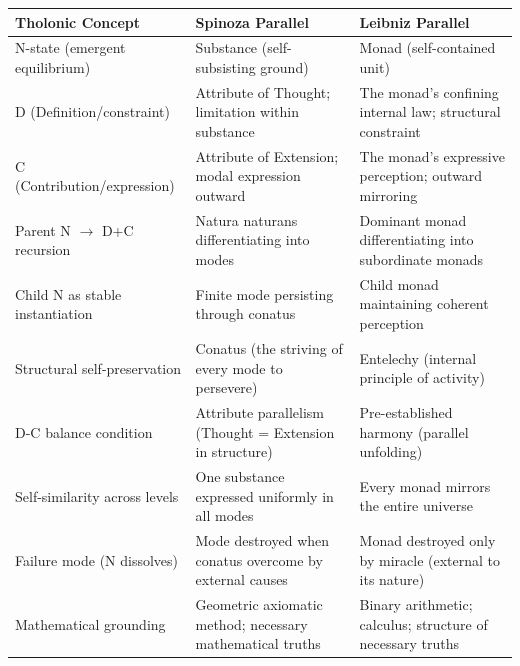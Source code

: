 \documentclass[12pt]{article}
\begin{document}
\begin{longtable}[]{@{}
  >{\raggedright\arraybackslash}p{}
  >{\raggedright\arraybackslash}p{}
  >{\raggedright\arraybackslash}p{}@{}}
\toprule\noalign{}
\begin{minipage}[b]{\linewidth}\raggedright
Tholonic Concept
\end{minipage} & \begin{minipage}[b]{\linewidth}\raggedright
Spinoza Parallel
\end{minipage} & \begin{minipage}[b]{\linewidth}\raggedright
Leibniz Parallel
\end{minipage} \\
\midrule\noalign{}
\endhead
\bottomrule\noalign{}
\endlastfoot
N-state (emergent equilibrium) & Substance (self-subsisting ground) &
Monad (self-contained unit) \\
D (Definition/constraint) & Attribute of Thought; limitation within
substance & The monad's confining internal law; structural constraint \\
C (Contribution/expression) & Attribute of Extension; modal expression
outward & The monad's expressive perception; outward mirroring \\
Parent N \(\to\) D+C recursion & Natura naturans differentiating into
modes & Dominant monad differentiating into subordinate monads \\
Child N as stable instantiation & Finite mode persisting through conatus
& Child monad maintaining coherent perception \\
Structural self-preservation & Conatus (the striving of every mode to
persevere) & Entelechy (internal principle of activity) \\
D-C balance condition & Attribute parallelism (Thought = Extension in
structure) & Pre-established harmony (parallel unfolding) \\
Self-similarity across levels & One substance expressed uniformly in all
modes & Every monad mirrors the entire universe \\
Failure mode (N dissolves) & Mode destroyed when conatus overcome by
external causes & Monad destroyed only by miracle (external to its
nature) \\
Mathematical grounding & Geometric axiomatic method; necessary
mathematical truths & Binary arithmetic; calculus; structure of
necessary truths \\
\end{longtable}
\end{document}
